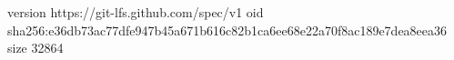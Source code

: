 version https://git-lfs.github.com/spec/v1
oid sha256:e36db73ac77dfe947b45a671b616c82b1ca6ee68e22a70f8ac189e7dea8eea36
size 32864
